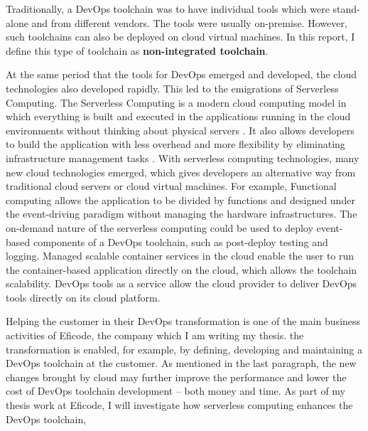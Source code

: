 \par
Traditionally, a DevOps toolchain was to have individual tools which were stand-alone and from different vendors. The tools were usually on-premise. However, such toolchains can also be deployed on cloud virtual machines. In this report, I define this type of toolchain as \textbf{non-integrated toolchain}.
\par
At the same period that the tools for DevOps emerged and developed, the cloud technologies also developed rapidly. This led to the emigrations of Serverless Computing. 
The Serverless Computing is a modern cloud computing model in which everything is built and executed in the applications running in the cloud environments without thinking about physical servers \cite{Serverle81:online}. It also allows developers to build the application with less overhead \cite{Serverle81:online} and more flexibility by eliminating infrastructure management tasks \cite{Serverle73:online}.
With serverless computing technologies, many new cloud technologies emerged, which gives developers an alternative way from traditional cloud servers or cloud virtual machines. For example, Functional computing allows the application to be divided by functions and designed under the event-driving paradigm without managing the hardware infrastructures. The on-demand nature of the serverless computing could be used to deploy event-based components of a DevOps toolchain, such as post-deploy testing and logging.
Managed scalable container services in the cloud enable the user to run the container-based application directly on the cloud, which allows the toolchain scalability. DevOps tools as a service \cite{DevOpsas45:online} allow the cloud provider to deliver DevOps tools directly on its cloud platform.
\par
Helping the customer in their DevOps transformation is one of the main business activities of Eficode, the company which I am writing my thesis. the transformation is enabled, for example, by defining, developing and maintaining a DevOps toolchain at the customer. As mentioned in the last paragraph, the new changes brought by cloud may further improve the performance and lower the cost of DevOps toolchain development -- both money and time. As part of my thesis work at Eficode, I will investigate how serverless computing enhances the DevOps toolchain,
